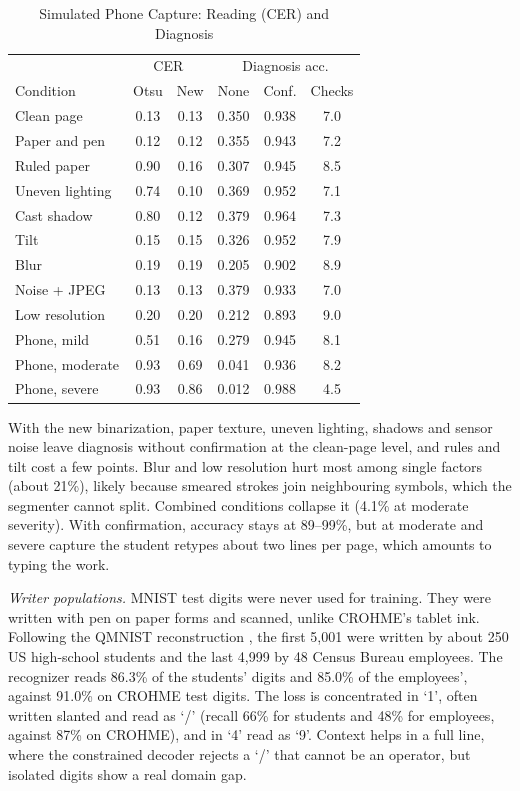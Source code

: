 \documentclass[conference]{IEEEtran}
\begin{document}
\begin{table}[!t]
\caption{Simulated Phone Capture: Reading (CER) and Diagnosis}
\label{tab:capture}
\centering
\footnotesize
\begin{tabular}{lccccc}
\toprule
 & \multicolumn{2}{c}{CER} & \multicolumn{3}{c}{Diagnosis acc.}\\
Condition & Otsu & New & None & Conf. & Checks\\
\midrule
Clean page & 0.13 & 0.13 & 0.350 & 0.938 & 7.0\\
Paper and pen & 0.12 & 0.12 & 0.355 & 0.943 & 7.2\\
Ruled paper & 0.90 & 0.16 & 0.307 & 0.945 & 8.5\\
Uneven lighting & 0.74 & 0.10 & 0.369 & 0.952 & 7.1\\
Cast shadow & 0.80 & 0.12 & 0.379 & 0.964 & 7.3\\
Tilt & 0.15 & 0.15 & 0.326 & 0.952 & 7.9\\
Blur & 0.19 & 0.19 & 0.205 & 0.902 & 8.9\\
Noise + JPEG & 0.13 & 0.13 & 0.379 & 0.933 & 7.0\\
Low resolution & 0.20 & 0.20 & 0.212 & 0.893 & 9.0\\
\midrule
Phone, mild & 0.51 & 0.16 & 0.279 & 0.945 & 8.1\\
Phone, moderate & 0.93 & 0.69 & 0.041 & 0.936 & 8.2\\
Phone, severe & 0.93 & 0.86 & 0.012 & 0.988 & 4.5\\
\bottomrule
\end{tabular}
\end{table}

With the new binarization, paper texture, uneven lighting, shadows and sensor noise leave diagnosis without confirmation at the clean-page level, and rules and tilt cost a few points. Blur and low resolution hurt most among single factors (about 21\%), likely because smeared strokes join neighbouring symbols, which the segmenter cannot split. Combined conditions collapse it (4.1\% at moderate severity). With confirmation, accuracy stays at 89--99\%, but at moderate and severe capture the student retypes about two lines per page, which amounts to typing the work.

\textit{Writer populations.} MNIST test digits \cite{mnist} were never used for training. They were written with pen on paper forms and scanned, unlike CROHME's tablet ink. Following the QMNIST reconstruction \cite{qmnist}, the first 5,001 were written by about 250 US high-school students and the last 4,999 by 48 Census Bureau employees. The recognizer reads 86.3\% of the students' digits and 85.0\% of the employees', against 91.0\% on CROHME test digits. The loss is concentrated in `1', often written slanted and read as `/' (recall 66\% for students and 48\% for employees, against 87\% on CROHME), and in `4' read as `9'. Context helps in a full line, where the constrained decoder rejects a `/' that cannot be an operator, but isolated digits show a real domain gap.
\end{document}
